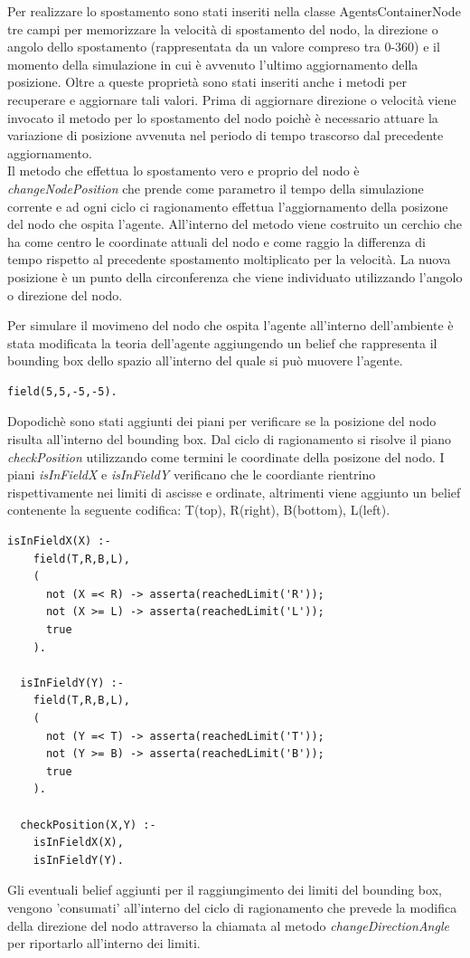 \documentclass[12pt,a4paper,openright,twoside]{report}
\begin{document}
Per realizzare lo spostamento sono stati inseriti nella classe AgentsContainerNode tre campi per memorizzare la velocit\`a di spostamento del nodo, la direzione o angolo dello spostamento (rappresentata da un valore compreso tra 0-360) e il momento della simulazione in cui \`e avvenuto l'ultimo aggiornamento della posizione.
Oltre a queste propriet\`a sono stati inseriti anche i metodi per recuperare e aggiornare tali valori. Prima di aggiornare direzione o velocit\`a viene invocato il metodo per lo spostamento del nodo poich\`e \`e necessario attuare la variazione di posizione avvenuta nel periodo di tempo trascorso dal precedente aggiornamento.
\\
Il metodo che effettua lo spostamento vero e proprio del nodo \`e \textit{changeNodePosition} che prende come parametro il tempo della simulazione corrente e ad ogni ciclo ci ragionamento effettua l'aggiornamento della posizone del nodo che ospita l'agente. All'interno del metodo viene costruito un cerchio che ha come centro le coordinate attuali del nodo e come raggio la differenza di tempo rispetto al precedente spostamento moltiplicato per la velocit\`a. La nuova posizione \`e un punto della circonferenza che viene individuato utilizzando l'angolo o direzione del nodo.

\bigskip

Per simulare il movimeno del nodo che ospita l'agente all'interno dell'ambiente \`e stata modificata la teoria dell'agente aggiungendo un belief che rappresenta il bounding box dello spazio all'interno del quale si pu\`o muovere l'agente.
\medskip
\begin{lstlisting}[firstnumber=1,caption={Bounding-box}]
  field(5,5,-5,-5).
\end{lstlisting}
Dopodich\`e sono stati aggiunti dei piani per verificare se la posizione del nodo risulta all'interno del bounding box. Dal ciclo di ragionamento si risolve il piano \textit{checkPosition} utilizzando come termini le coordinate della posizone del nodo.
I piani \textit{isInFieldX} e \textit{isInFieldY} verificano che le coordiante rientrino rispettivamente nei limiti di ascisse e ordinate, altrimenti viene aggiunto un belief contenente la seguente codifica: T(top), R(right), B(bottom), L(left).
\medskip
\begin{lstlisting}[firstnumber=18,caption={Piani per la gestione del bounding-box}]
  isInFieldX(X) :-
    field(T,R,B,L),
    (
      not (X =< R) -> asserta(reachedLimit('R'));
      not (X >= L) -> asserta(reachedLimit('L'));
      true
    ).

  isInFieldY(Y) :-
    field(T,R,B,L),
    (
      not (Y =< T) -> asserta(reachedLimit('T'));
      not (Y >= B) -> asserta(reachedLimit('B'));
      true
    ).

  checkPosition(X,Y) :-
    isInFieldX(X),
    isInFieldY(Y).
\end{lstlisting}
Gli eventuali belief aggiunti per il raggiungimento dei limiti del bounding box, vengono 'consumati' all'interno del ciclo di ragionamento che prevede la modifica della direzione del nodo attraverso la chiamata al metodo \textit{changeDirectionAngle} per riportarlo all'interno dei limiti.
\end{document}
